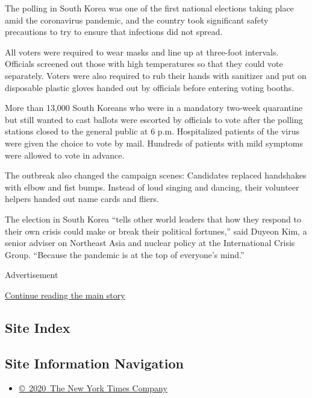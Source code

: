 The polling in South Korea was one of the first national elections
taking place amid the coronavirus pandemic, and the country took
significant safety precautions to try to ensure that infections did not
spread.

All voters were required to wear masks ​and line up at three-foot
intervals​. Officials screened out ​those with high temperatures so that
they could vote ​separately. Voters were also required to rub their
hands with sanitizer and put on disposable plastic gloves handed out by
officials before ​entering ​voting​ booths​​.​

More​ than 13,000 ​South Koreans who were in a mandatory two-week
quarantine but still wanted to cast ballots were escorted by officials
to vote after​ the polling stations closed to the general public at 6
p.m. Hospitalized patients of the virus were given the choice to vote by
mail. Hundreds of patients with mild symptoms were allowed to vote in
advance.

The outbreak also changed the campaign scenes: ​Candidates replaced
handshakes with elbow and fist bumps.​ Instead of loud singing and
dancing, ​their ​​volunteer helpers handed​ out name cards and fliers.

​The election in South Korea ``tells other world leaders that how they
respond to their own crisis could make or break their political
fortunes,'' said Duyeon Kim, a senior adviser on Northeast Asia and
nuclear policy at the International Crisis Group. ``Because the pandemic
is at the top of everyone's mind.''

Advertisement

\protect\hyperlink{after-bottom}{Continue reading the main story}

\hypertarget{site-index}{%
\subsection{Site Index}\label{site-index}}

\hypertarget{site-information-navigation}{%
\subsection{Site Information
Navigation}\label{site-information-navigation}}

\begin{itemize}
\tightlist
\item
  \href{https://help.nytimes3xbfgragh.onion/hc/en-us/articles/115014792127-Copyright-notice}{©~2020~The
  New York Times Company}
\end{itemize}

